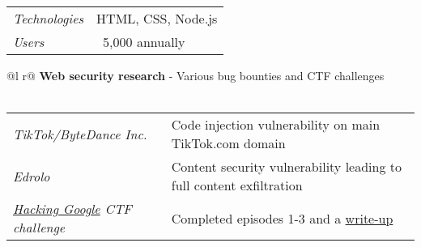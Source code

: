 \documentclass[a4paper,10pt]{article}
\begin{document}
\begin{tabularx}{\linewidth}{l X}
    \textit{Technologies} & \hfill HTML, CSS, Node.js \\
    \textit{Users} & \hfill ~5,000 annually \\
\end{tabularx}

\begin{tabularx}{\linewidth}{ @{}l r@{} }
\textbf{Web security research} - Various bug bounties and CTF challenges \\[3.75pt]
  \\
\end{tabularx}

\begin{tabularx}{\linewidth}{l X}
    \textit{TikTok/ByteDance Inc.} & \hfill Code injection vulnerability on main TikTok.com domain \\
    \textit{Edrolo} & \hfill Content security vulnerability leading to full content exfiltration \\
    \textit{\href{https://h4ck1ng.google/}{Hacking Google} CTF challenge} & \hfill Completed episodes 1-3 and a \href{https://srg.id.au/posts/hacking-google/}{write-up} \\
\end{tabularx}

\end{document}
